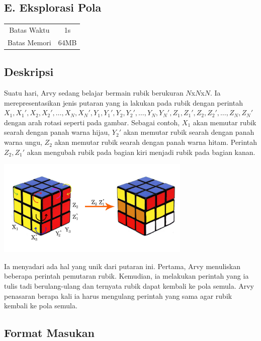 \documentclass{article}
\begin{document}
\begin{center}
    \section*{E. Eksplorasi Pola} %

    \begin{tabular}{ | c c | }
        \hline
        Batas Waktu  & 1s \\    %
        Batas Memori & 64MB \\  %
        \hline
    \end{tabular}
\end{center}

\subsection*{Deskripsi}

Suatu hari, Arvy sedang belajar bermain rubik berukuran $N$x$N$x$N$.
Ia merepresentasikan jenis putaran yang ia lakukan pada rubik dengan perintah $X_1,X_1',X_2,X_2',\dots,X_N,X_N',Y_1,Y_1',Y_2,Y_2',\dots,Y_N,Y_N',Z_1,Z_1',Z_2,Z_2',\dots,Z_N,Z_N'$ dengan arah rotasi seperti pada gambar. 
Sebagai contoh, $X_1$ akan memutar rubik searah dengan panah warna hijau, $Y_2'$ akan memutar rubik searah dengan panah warna ungu, $Z_2$ akan memutar rubik searah dengan panah warna hitam. 
Perintah $Z_2,Z_1'$ akan mengubah rubik pada bagian kiri menjadi rubik pada bagian kanan.

\begin{center}
    \includegraphics[width=350px]{rubic}
\end{center}
Ia menyadari ada hal yang unik dari putaran ini.
Pertama, Arvy menuliskan beberapa perintah pemutaran rubik.
Kemudian, ia melakukan perintah yang ia tulis tadi berulang-ulang dan ternyata rubik dapat kembali ke pola semula.
Arvy penasaran berapa kali ia harus mengulang perintah yang sama agar rubik kembali ke pola semula.

\subsection*{Format Masukan}
\end{document}
